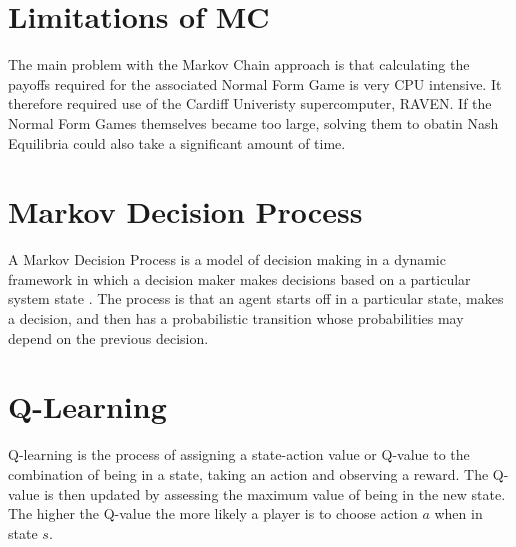 \documentclass[a0,landscape]{a0poster}
\begin{document}
\begin{multicols}{3}
\color{Olive}
\section*{Limitations of MC}
The main problem with the Markov Chain approach is that calculating the payoffs required for the associated Normal Form Game is very CPU intensive.
It therefore required use of the Cardiff Univeristy supercomputer, RAVEN.
If the Normal Form Games themselves became too large, solving them to obatin Nash Equilibria could also take a significant amount of time.


\color{SteelBlue}
\section*{Markov Decision Process}
A Markov Decision Process is a model of decision making in a dynamic framework in which a decision maker makes decisions based on a particular system state \cite{puterman2009markov}.
The process is that an agent starts off in a particular state, makes a decision, and then has a probabilistic transition whose probabilities may depend on the previous decision.

\section*{Q-Learning}
Q-learning is the process of assigning a state-action value or Q-value to the combination of being in a state, taking an action and observing a reward.
The Q-value is then updated by assessing the maximum value of being in the new state.
The higher the Q-value the more likely a player is to choose action $a$ when in state $s$.



\end{multicols}
\end{document}
